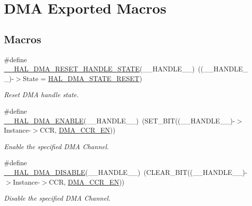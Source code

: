 \hypertarget{group___d_m_a___exported___macros}{\section{D\-M\-A Exported Macros}
\label{group___d_m_a___exported___macros}
}
\subsection*{Macros}
\begin{DoxyCompactItemize}
\item 
\#define \hyperlink{group___d_m_a___exported___macros_gaadcee34f0999c8eafd37de2f69daa0ac}{\-\_\-\-\_\-\-H\-A\-L\-\_\-\-D\-M\-A\-\_\-\-R\-E\-S\-E\-T\-\_\-\-H\-A\-N\-D\-L\-E\-\_\-\-S\-T\-A\-T\-E}(\-\_\-\-\_\-\-H\-A\-N\-D\-L\-E\-\_\-\-\_\-)~((\-\_\-\-\_\-\-H\-A\-N\-D\-L\-E\-\_\-\-\_\-)-\/$>$State = \hyperlink{group___d_m_a___exported___types_gga9c012af359987a240826f29073bbe463a9e7be73da32b8c837cde0318e0d5eed2}{H\-A\-L\-\_\-\-D\-M\-A\-\_\-\-S\-T\-A\-T\-E\-\_\-\-R\-E\-S\-E\-T})
\begin{DoxyCompactList}\small\item\em Reset D\-M\-A handle state. \end{DoxyCompactList}\item 
\#define \hyperlink{group___d_m_a___exported___macros_ga93900b3ef3f87ef924eb887279a434b4}{\-\_\-\-\_\-\-H\-A\-L\-\_\-\-D\-M\-A\-\_\-\-E\-N\-A\-B\-L\-E}(\-\_\-\-\_\-\-H\-A\-N\-D\-L\-E\-\_\-\-\_\-)~(S\-E\-T\-\_\-\-B\-I\-T((\-\_\-\-\_\-\-H\-A\-N\-D\-L\-E\-\_\-\-\_\-)-\/$>$Instance-\/$>$C\-C\-R, \hyperlink{group___peripheral___registers___bits___definition_gababa3817d21a78079be76bc26b2c10f2}{D\-M\-A\-\_\-\-C\-C\-R\-\_\-\-E\-N}))
\begin{DoxyCompactList}\small\item\em Enable the specified D\-M\-A Channel. \end{DoxyCompactList}\item 
\#define \hyperlink{group___d_m_a___exported___macros_gafeef4c5e8c3f015cdecc0f37bbe063dc}{\-\_\-\-\_\-\-H\-A\-L\-\_\-\-D\-M\-A\-\_\-\-D\-I\-S\-A\-B\-L\-E}(\-\_\-\-\_\-\-H\-A\-N\-D\-L\-E\-\_\-\-\_\-)~(C\-L\-E\-A\-R\-\_\-\-B\-I\-T((\-\_\-\-\_\-\-H\-A\-N\-D\-L\-E\-\_\-\-\_\-)-\/$>$Instance-\/$>$C\-C\-R, \hyperlink{group___peripheral___registers___bits___definition_gababa3817d21a78079be76bc26b2c10f2}{D\-M\-A\-\_\-\-C\-C\-R\-\_\-\-E\-N}))
\begin{DoxyCompactList}\small\item\em Disable the specified D\-M\-A Channel. \end{DoxyCompactList}\item 

\end{DoxyCompactItemize}
